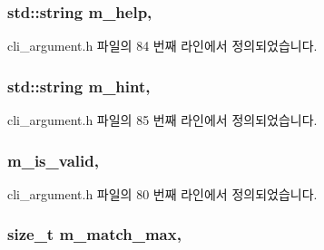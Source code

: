 \subsubsection[{\texorpdfstring{m\+\_\+help}{m_help}}]{\setlength{\rightskip}{0pt plus 5cm}std\+::string m\+\_\+help\hspace{0.3cm}{\ttfamily [protected]}, {\ttfamily [inherited]}}\hypertarget{classcli__argument_a3985971d45415a337f60ed183b445c96}{}\label{classcli__argument_a3985971d45415a337f60ed183b445c96}


cli\+\_\+argument.\+h 파일의 84 번째 라인에서 정의되었습니다.

\subsubsection[{\texorpdfstring{m\+\_\+hint}{m_hint}}]{\setlength{\rightskip}{0pt plus 5cm}std\+::string m\+\_\+hint\hspace{0.3cm}{\ttfamily [protected]}, {\ttfamily [inherited]}}\hypertarget{classcli__argument_a3feeeba99be6bb94b8fa0ebc88ef09cf}{}\label{classcli__argument_a3feeeba99be6bb94b8fa0ebc88ef09cf}


cli\+\_\+argument.\+h 파일의 85 번째 라인에서 정의되었습니다.

\subsubsection[{\texorpdfstring{m\+\_\+is\+\_\+valid}{m_is_valid}}]{ m\+\_\+is\+\_\+valid\hspace{0.3cm}{\ttfamily [protected]}, {\ttfamily [inherited]}}\hypertarget{classcli__argument_a3163252d457c8ef3a286a8538d7e319f}{}\label{classcli__argument_a3163252d457c8ef3a286a8538d7e319f}


cli\+\_\+argument.\+h 파일의 80 번째 라인에서 정의되었습니다.

\subsubsection[{\texorpdfstring{m\+\_\+match\+\_\+max}{m_match_max}}]{\setlength{\rightskip}{0pt plus 5cm}size\+\_\+t m\+\_\+match\+\_\+max\hspace{0.3cm}{\ttfamily [protected]}, {\ttfamily [inherited]}}\hypertarget{classcli__argument_a6f9fd009acee86b73a9f1b8e80a95b43}{}\label{classcli__argument_a6f9fd009acee86b73a9f1b8e80a95b43}


